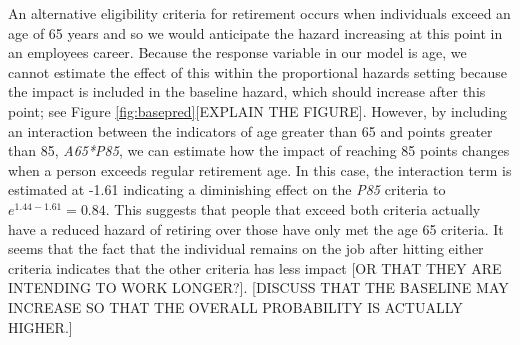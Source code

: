 \documentclass[12pt,letterpaper]{article}
\begin{document}
An alternative eligibility criteria for retirement occurs when individuals exceed an age of 65 years and so we would anticipate the hazard increasing at this point in an employees career.  Because the response variable in our model is age, we cannot estimate the effect of this within the proportional hazards setting because the impact is included in the baseline hazard, which should increase after this point; see Figure \ref{fig:basepred}[EXPLAIN THE FIGURE].  However, by including an interaction between the indicators of age greater than 65 and points greater than 85, {\it A65*P85}, we can estimate how the impact of reaching 85 points changes when a person exceeds regular retirement age.  In this case, the interaction term is estimated at -1.61 indicating a diminishing effect on the {\it P85} criteria to $e^{1.44-1.61} =0.84$.  This suggests that people that exceed both criteria actually have a reduced hazard of retiring over those have only met the age 65 criteria.  It seems that the fact that the individual remains on the job after hitting either criteria indicates that the other criteria has less impact [OR THAT THEY ARE INTENDING TO WORK LONGER?].  [DISCUSS THAT THE BASELINE MAY INCREASE SO THAT THE OVERALL PROBABILITY IS ACTUALLY HIGHER.]
\end{document}
